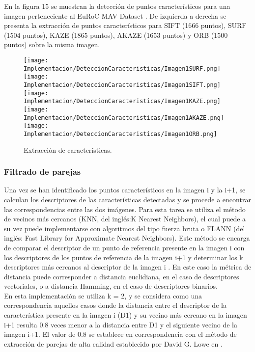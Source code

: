 En la figura 15 se muestran la detección de puntos característicos  para una imagen perteneciente al EuRoC MAV Dataset \cite{0}. De izquierda a derecha se presenta la extracción de  puntos característicos para SIFT (1666 puntos), SURF (1504 puntos), KAZE (1865 puntos), AKAZE (1653 puntos) y ORB (1500 puntos) sobre la misma imagen. \\
\begin{figure}[H]
	
	\texttt{[image: Implementacion/DeteccionCaracteristicas/Imagen1SURF.png]}
	\texttt{[image: Implementacion/DeteccionCaracteristicas/Imagen1SIFT.png]}
	\texttt{[image: Implementacion/DeteccionCaracteristicas/Imagen1KAZE.png]}
	\texttt{[image: Implementacion/DeteccionCaracteristicas/Imagen1AKAZE.png]}
	\texttt{[image: Implementacion/DeteccionCaracteristicas/Imagen1ORB.png]}
	\caption{Extracción de características.}
	\label{fig:my_label}
\end{figure}


\subsubsection{Filtrado de parejas}


Una vez se han identificado los puntos característicos en la imagen i y la i+1, se calculan los descriptores de las características detectadas y se procede a encontrar las correspondencias entre las dos imágenes. Para esta tarea se utiliza el método de vecinos más cercanos (KNN, del inglés:K Nearest Neighbors), el cual puede a su vez puede implementarse con algoritmos del tipo fuerza bruta o FLANN (del inglés: Fast Library for Approximate Nearest Neighbors). Este método se encarga de comparar el descriptor de un punto de referencia presente en la imagen i con los descriptores de los puntos de referencia de la imagen i+1 y determinar los k descriptores más cercanos al descriptor de la imagen i . En este caso la métrica de distancia puede corresponder a distancia euclidiana, en el caso de descriptores vectoriales, o a distancia Hamming, en el caso de descriptores binarios.\\

En esta implementación se utiliza k = 2, y se considera como una correspondencia aquellos casos donde la distancia entre el descriptor de la característica presente en la imagen i (D1) y su vecino más cercano en la imagen i+1 resulta 0.8 veces menor a la distancia entre D1 y el siguiente vecino de la imagen i+1. El valor de 0.8 se establece en correspondencia con el método de extracción de parejas de alta calidad establecido por David G. Lowe en \cite{1}.\\

